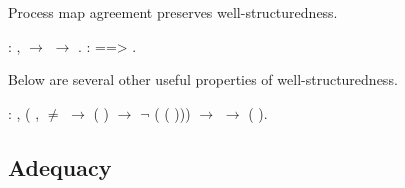 \documentclass[12pt]{report}
\begin{document}
Process map agreement preserves well-structuredness. \begin{coqdoccode}
\coqdocemptyline
\coqdocnoindent
{}  :\coqdoceol
\coqdocindent{1.00em}
\coqdockw{\ensuremath{\forall}}  ,\coqdoceol
\coqdocindent{1.00em}
   \ensuremath{\rightarrow}   \ensuremath{\rightarrow}  .\coqdoceol
\coqdocnoindent
{}   : \coqdoceol
\coqdocindent{1.00em}
   ==>   .\coqdoceol
\coqdocemptyline
\end{coqdoccode}
Below are several other useful properties
    of well-structuredness. \begin{coqdoccode}
\coqdocemptyline
\coqdocnoindent
{}  :\coqdoceol
\coqdocindent{1.00em}
\coqdockw{\ensuremath{\forall}}   ,\coqdoceol
\coqdocindent{2.00em}
(\coqdockw{\ensuremath{\forall}}  ,  \ensuremath{\not=}  \ensuremath{\rightarrow}   ( ) \ensuremath{\rightarrow} \ensuremath{\lnot}   ( ( ))) \ensuremath{\rightarrow}\coqdoceol
\coqdocindent{1.00em}
  \ensuremath{\rightarrow}\coqdoceol
\coqdocindent{1.00em}
 (   ).\coqdoceol
\coqdocemptyline
\end{coqdoccode}
\subsection{Adequacy}
\end{document}
